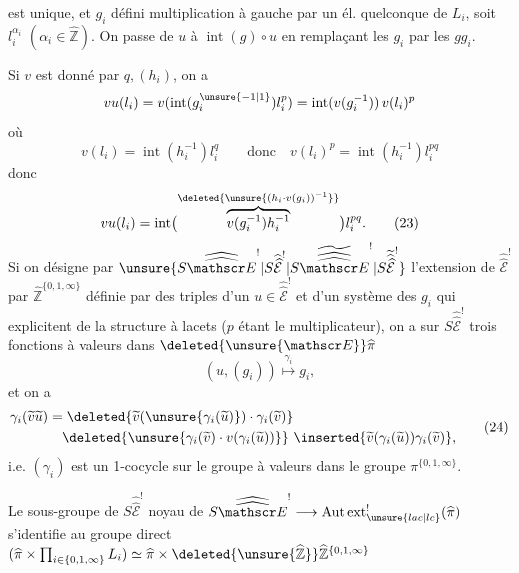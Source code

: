 est unique, et $g_i$ défini multiplication à gauche par un él. quelconque de $L_i$, soit $l_i^{\alpha_i}$ $(\alpha_i\in\widehat{\mathbb Z})$. On passe de $u$ à $\operatorname{int}(g)\circ u$ en  remplaçant les $g_i$ par les $gg_i$.

Si $v$ est donné par $q,(h_i)$, on a
\[
vu(l_i)=v(\operatorname{int}(g_i^{\unsure{-1|1}})l_i^p)=\operatorname{int}(v(g_i^{-1}))\,v(l_i)^p
\]
où
\[
v(l_i)=\operatorname{int}(h_i^{-1})l_i^q\qquad\text{donc}\quad v(l_i)^p=\operatorname{int}(h_i^{-1})l_i^{pq}
\]
donc
\[
vu(l_i)=\operatorname{int}\bigl(\overbrace{v(g_i^{-1})h_i^{-1}}^{\deleted{\unsure{(h_i\cdot v(g_i))^{-1}}}}\bigr)l_i^{pq}.\tag*{(23)}
\]
Si on désigne par $\unsure{S\widehat{\widehat{\mathscr E}}^{!}|S\widehat{\widehat{\mathcal E}}^{!}|S\widetilde{\widehat{\widehat{\mathscr E}}}^{!}|S\widetilde{\widehat{\widehat{\mathcal E}}}^{!}}$ l'extension de $\widehat{\widehat{\mathscr E}}^{!}$ par $\widehat{\mathbb Z}^{\{0,1,\infty\}}$ définie par   des  triples d'un $u\in\widehat{\widehat{\mathscr E}}^{!}$ et d'un système des $g_i$ qui explicitent   de la structure à lacets ($p$ étant le multiplicateur), on a sur $S\widehat{\widehat{\mathscr E}}^{!}$ trois fonctions à valeurs dans $\deleted{\unsure{\mathscr E}}\widehat\pi$
\[
(u,(g_i))\overset{\gamma_i}{\longmapsto}g_i,
\]
et on a
\[
\begin{aligned}
\gamma_i(\widetilde v\widetilde u)
&=\deleted{\widetilde v(\unsure{\gamma_i(\widetilde u)})\cdot\gamma_i(\widetilde v)}\\
&\quad\deleted{\unsure{\gamma_i(\widetilde v)\cdot v(\gamma_i(\widetilde u))}}\ \inserted{\widetilde v(\gamma_i(\widetilde u))\gamma_i(\widetilde v)},
\end{aligned}\tag*{(24)}
\]
i.e. $(\gamma_i)$ est un 1-cocycle sur le groupe \deleted{$\unsure{\widehat\pi}$}  à valeurs dans le groupe   $\pi^{\{0,1,\infty\}}$. 

Le sous-groupe de $S\widehat{\widehat{\mathscr E}}^{!}$ noyau de $S\widehat{\widehat{\mathscr E}}^{!}\longrightarrow\operatorname{Aut}\operatorname{ext}_{\unsure{lac|lc}}^{!}(\widehat\pi)$ s'identifie au groupe  direct $(\widehat\pi\times\prod_{i\in\{0,1,\infty\}}L_i)\simeq\widehat\pi\times\deleted{\unsure{\widehat{\mathbb Z}}}\widehat{\mathbb Z}^{\{0,1,\infty\}}$

